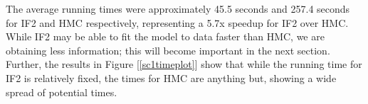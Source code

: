     The average running times were approximately 45.5 seconds and 257.4 seconds for IF2 and HMC respectively, representing a 5.7x speedup for IF2 over HMC. While IF2 may be able to fit the model to data faster than HMC, we are obtaining less information; this will become important in the next section. Further, the results in Figure [\ref{sc1timeplot}] show that while the running time for IF2 is relatively fixed, the times for HMC are anything but, showing a wide spread of potential times.
